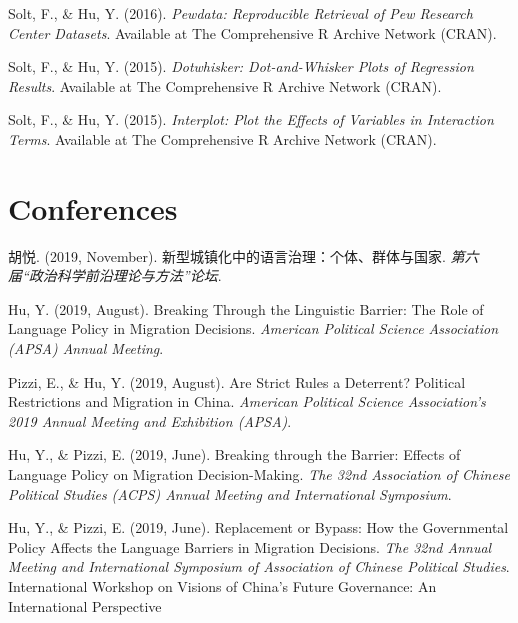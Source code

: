 \documentclass[11pt, a4paper]{awesome-cv}
\begin{document}
\begingroup
\setlength{\parindent}{-0.5in}
\setlength{\leftskip}{0.5in}

\hypertarget{refs_software}{}
\leavevmode\hypertarget{ref-SoltHu2016}{}%
Solt, F., \& Hu, Y. (2016). \emph{Pewdata: Reproducible Retrieval of Pew
Research Center Datasets}. Available at The Comprehensive R Archive
Network (CRAN).

\leavevmode\hypertarget{ref-SoltHu2015}{}%
Solt, F., \& Hu, Y. (2015). \emph{Dotwhisker: Dot-and-Whisker Plots of
Regression Results}. Available at The Comprehensive R Archive Network
(CRAN).

\leavevmode\hypertarget{ref-SoltHu2015a}{}%
Solt, F., \& Hu, Y. (2015). \emph{Interplot: Plot the Effects of
Variables in Interaction Terms}. Available at The Comprehensive R
Archive Network (CRAN).

\endgroup

\hypertarget{conferences}{%
\section{Conferences}\label{conferences}}

\begingroup
\setlength{\parindent}{-0.5in}
\setlength{\leftskip}{0.5in}

\hypertarget{refs_conference}{}
\leavevmode\hypertarget{ref-HuYue2019}{}%
胡悦. (2019, November). 新型城镇化中的语言治理：个体、群体与国家.
\emph{第六届``政治科学前沿理论与方法''论坛}.

\leavevmode\hypertarget{ref-Hu2019a}{}%
Hu, Y. (2019, August). Breaking Through the Linguistic Barrier: The Role
of Language Policy in Migration Decisions. \emph{American Political
Science Association (APSA) Annual Meeting}.

\leavevmode\hypertarget{ref-PizziHu2019}{}%
Pizzi, E., \& Hu, Y. (2019, August). Are Strict Rules a Deterrent?
Political Restrictions and Migration in China. \emph{American Political
Science Association's 2019 Annual Meeting and Exhibition (APSA)}.

\leavevmode\hypertarget{ref-HuPizzi2019}{}%
Hu, Y., \& Pizzi, E. (2019, June). Breaking through the Barrier: Effects
of Language Policy on Migration Decision-Making. \emph{The 32nd
Association of Chinese Political Studies (ACPS) Annual Meeting and
International Symposium}.

\leavevmode\hypertarget{ref-HuPizzi2019a}{}%
Hu, Y., \& Pizzi, E. (2019, June). Replacement or Bypass: How the
Governmental Policy Affects the Language Barriers in Migration
Decisions. \emph{The 32nd Annual Meeting and International Symposium of
Association of Chinese Political Studies}.\\
International Workshop on Visions of China's Future Governance: An
International Perspective
\end{document}
